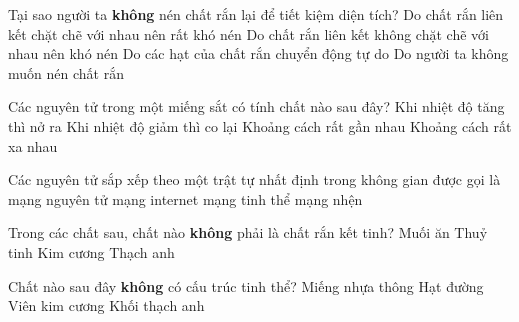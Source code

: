 \begin{ex}
	Tại sao người ta \textbf{không} nén chất rắn lại để tiết kiệm diện tích?
	\choice
	{\True Do chất rắn liên kết chặt chẽ với nhau nên rất khó nén}
	{Do chất rắn liên kết không chặt chẽ với nhau nên khó nén}
	{Do các hạt của chất rắn chuyển động tự do}
	{Do người ta không muốn nén chất rắn}
\end{ex}

\begin{ex}
	Các nguyên tử trong một miếng sắt có tính chất nào sau đây?
	\choice
	{Khi nhiệt độ tăng thì nở ra}
	{Khi nhiệt độ giảm thì co lại}
	{\True Khoảng cách rất gần nhau}
	{Khoảng cách rất xa nhau}
\end{ex}

\begin{ex}
	Các nguyên tử sắp xếp theo một trật tự nhất định trong không gian được gọi là
	\choice
	{mạng nguyên tử}
	{mạng internet}
	{\True mạng tinh thể}
	{mạng nhện}
\end{ex}

\begin{ex}
	Trong các chất sau, chất nào \textbf{không} phải là chất rắn kết tinh?
	\choice
	{Muối ăn}
	{\True Thuỷ tinh}
	{Kim cương}
	{Thạch anh}
\end{ex}

\begin{ex}
	Chất nào sau đây \textbf{không} có cấu trúc tinh thể?
	\choice
	{\True Miếng nhựa thông}
	{Hạt đường}
	{Viên kim cương}
	{Khối thạch anh}
\end{ex}

